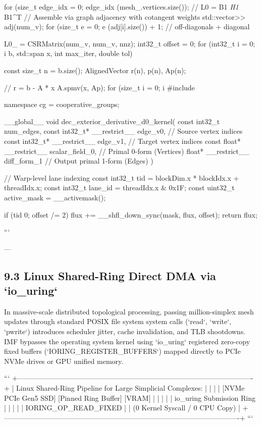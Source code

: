 \documentclass[11pt,twoside,openright]{amsbook}
\begin{document}
{{{{{                for (size_t edge_idx = 0; edge_idx (mesh_.vertices.size());
        // L0 = B1 \textit{ H1 } B1^T
        // Assemble via graph adjacency with cotangent weights
        std::vector>> adj(num_v);
        for (size_t e = 0; e (adj[i].size()) + 1; // off-diagonals + diagonal
        }

        L0_ = CSRMatrix(num_v, num_v, nnz);
        int32_t offset = 0;
        for (int32_t i = 0; i  b, 
                         std::span x, int max_iter, double tol) {
        const size_t n = b.size();
        AlignedVector r(n), p(n), Ap(n);

        // r = b - A * x
        A.spmv(x, Ap);
        for (size_t i = 0; i 
#include 

namespace cg = cooperative_groups;

__global__ void dec_exterior_derivative_d0_kernel(
    const int32_t num_edges,
    const int32_t* __restrict__ edge_v0,       // Source vertex indices
    const int32_t* __restrict__ edge_v1,       // Target vertex indices
    const float* __restrict__ scalar_field_0,   // Primal 0-form (Vertices)
    float* __restrict__ diff_form_1             // Output primal 1-form (Edges)
) {
    // Warp-level lane indexing
    const int32_t tid = blockDim.x * blockIdx.x + threadIdx.x;
    const int32_t lane_id = threadIdx.x & 0x1F;
    const uint32_t active_mask = __activemask();

    if (tid  0; offset /= 2) {
        flux += __shfl_down_sync(mask, flux, offset);
    }
    return flux;
}
```

---

\subsection{9.3 Linux Shared-Ring Direct DMA via `io_uring`}

In massive-scale distributed topological processing, passing million-simplex mesh updates through standard POSIX file system system calls (`read`, `write`, `pwrite`) introduces scheduler jitter, cache invalidation, and TLB shootdowns. IMF bypasses the operating system kernel using `io_uring` registered zero-copy fixed buffers (`IORING_REGISTER_BUFFERS`) mapped directly to PCIe NVMe drives or GPU unified memory.

```
+----------------------------------------------------------------------------------------------------+
| Linux Shared-Ring Pipeline for Large Simplicial Complexes:                                  |
|                                                                                                    |
|  [NVMe PCIe Gen5 SSD]  [Pinned Ring Buffer]  [VRAM]   |
|                                                      |                                             |
|                                          io_uring Submission Ring                          |
|                                                      |                                             |
|                                             IORING_OP_READ_FIXED                                   |
|                                             (0 Kernel Syscall / 0 CPU Copy)                        |
+----------------------------------------------------------------------------------------------------+
```

}}}}}
\end{document}
